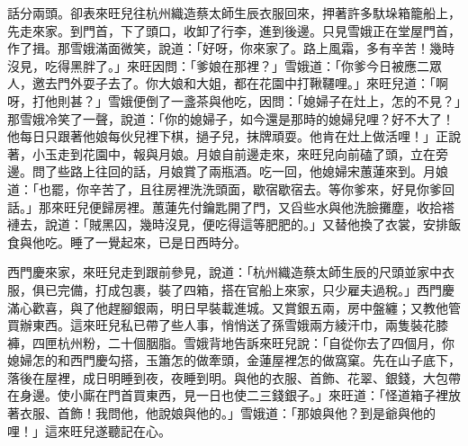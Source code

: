 \begin{showcontents}{}
話分兩頭。卻表來旺兒往杭州織造蔡太師生辰衣服回來，押著許多馱垛箱籠船上，先走來家。到門首，下了頭口，收卸了行李，進到後邊。只見雪娥正在堂屋門首，作了揖。那雪娥滿面微笑，說道：「好呀，你來家了。路上風霜，多有辛苦！幾時沒見，吃得黑胖了。」來旺因問：「爹娘在那裡？」雪娥道：「你爹今日被應二眾人，邀去門外耍子去了。你大娘和大姐，都在花園中打鞦韆哩。」來旺兒道：「啊呀，打他則甚？」雪娥便倒了一盞茶與他吃，因問：「媳婦子在灶上，怎的不見？」那雪娥冷笑了一聲，說道：「你的媳婦子，如今還是那時的媳婦兒哩？好不大了！他每日只跟著他娘每伙兒裡下棋，撾子兒，抹牌頑耍。他肯在灶上做活哩！」正說著，小玉走到花園中，報與月娘。月娘自前邊走來，來旺兒向前磕了頭，立在旁邊。問了些路上往回的話，月娘賞了兩瓶酒。吃一回，他媳婦宋蕙蓮來到。月娘道：「也罷，你辛苦了，且往房裡洗洗頭面，歇宿歇宿去。等你爹來，好見你爹回話。」那來旺兒便歸房裡。蕙蓮先付鑰匙開了門，又舀些水與他洗臉攤塵，收拾褡褳去，說道：「賊黑囚，幾時沒見，便吃得這等肥肥的。」又替他換了衣裳，安排飯食與他吃。睡了一覺起來，已是日西時分。

西門慶來家，來旺兒走到跟前參見，說道：「杭州織造蔡太師生辰的尺頭並家中衣服，俱已完備，打成包裹，裝了四箱，搭在官船上來家，只少雇夫過稅。」西門慶滿心歡喜，與了他趕腳銀兩，明日早裝載進城。又賞銀五兩，房中盤纏；又教他管買辦東西。這來旺兒私已帶了些人事，悄悄送了孫雪娥兩方綾汗巾，兩隻裝花膝褲，四匣杭州粉，二十個胭脂。雪娥背地告訴來旺兒說：「自從你去了四個月，你媳婦怎的和西門慶勾搭，玉簫怎的做牽頭，金蓮屋裡怎的做窩窠。先在山子底下，落後在屋裡，成日明睡到夜，夜睡到明。與他的衣服、首飾、花翠、銀錢，大包帶在身邊。使小廝在門首買東西，見一日也使二三錢銀子。」來旺道：「怪道箱子裡放著衣服、首飾！我問他，他說娘與他的。」雪娥道：「那娘與他？到是爺與他的哩！」這來旺兒遂聽記在心。


\end{showcontents}
